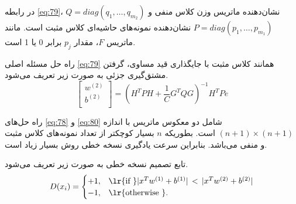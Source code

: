 در رابطه \ref{eq:79}،  $Q=diag(q_1,\dots,q_{m_{2}})$ نشان‌دهنده ماتریس وزن کلاس منفی و  $P=diag(p_1,\dots  ,p_{m_{1}})$ نشان‌دهنده نمونه‌های حاشیه‌ای کلاس مثبت است. مانند ماتریس $F$، مقدار $p_j$  برابر 0 یا 1 است.

راه حل مسئله اصلی \ref{eq:79} همانند کلاس مثبت با جایگذاری قید مساوی، گرفتن مشتق‌گیری جزئی به صورت زیر تعریف می‌شود.
\begin{equation}\label{eq:80}
\left[ \begin{matrix}
{{w}^{\left( 2 \right)}}  \\
{{b}^{\left( 2 \right)}}  \\
\end{matrix} \right] = {{({{H}^{T}}PH+\frac{1}{C}{{G}^{T}}QG)}^{-1}}{{H}^{T}}Pe
\end{equation}

راه حل‌های \ref{eq:78} و \ref{eq:80} شامل دو معکوس ماتریس با اندازه $(n+1)\times (n +1)$ است. بطوریکه $n$ بسیار کوچکتر از تعداد نمونه‌های کلاس مثبت و منفی می‌باشد. بنابراین سرعت یادگیری نسخه خطی روش  بسیار زیاد است.

تابع تصمیم نسخه خطی به صورت زیر تعریف می‌شود.
\begin{equation}\label{eq:81}
D(x_i) =
\begin{cases}
+1, & \textrm{\lr{if }} |{{x}^T}{{w}^{(1)}}+{{b}^{(1)}}|\, < \, |{{x}^T}{{w}^{(2)}}+{{b}^{(2)}}|  \\
-1, & \textrm{\lr{otherwise }}.
\end{cases}
\end{equation}


